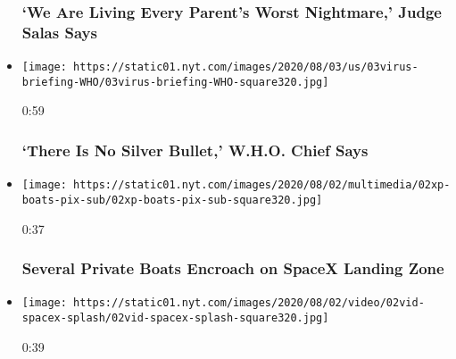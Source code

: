 \begin{itemize}
  \hypertarget{we-are-living-every-parents-worst-nightmare-judge-salas-says}{%
  \subsubsection{`We Are Living Every Parent's Worst Nightmare,' Judge
  Salas
  Says}\label{we-are-living-every-parents-worst-nightmare-judge-salas-says}}
\item
  \href{https://www.nytimes.com/video/world/europe/100000007269932/who-coronavirus-briefing.html?action=click\&module=video-series-bar\&region=header\&pgtype=Article\&playlistId=video/latest-video}{}

  \texttt{[image: https://static01.nyt.com/images/2020/08/03/us/03virus-briefing-WHO/03virus-briefing-WHO-square320.jpg]}

  0:59

  \hypertarget{there-is-no-silver-bullet-who-chief-says}{%
  \subsubsection{`There Is No Silver Bullet,' W.H.O. Chief
  Says}\label{there-is-no-silver-bullet-who-chief-says}}
\item
  \href{https://www.nytimes.com/video/us/100000007269193/boats-circle-spacex-capsule.html?action=click\&module=video-series-bar\&region=header\&pgtype=Article\&playlistId=video/latest-video}{}

  \texttt{[image: https://static01.nyt.com/images/2020/08/02/multimedia/02xp-boats-pix-sub/02xp-boats-pix-sub-square320.jpg]}

  0:37

  \hypertarget{several-private-boats-encroach-on-spacex-landing-zone}{%
  \subsubsection{Several Private Boats Encroach on SpaceX Landing
  Zone}\label{several-private-boats-encroach-on-spacex-landing-zone}}
\item
  \href{https://www.nytimes.com/video/us/100000007269118/spacex-splash-down.html?action=click\&module=video-series-bar\&region=header\&pgtype=Article\&playlistId=video/latest-video}{}

  \texttt{[image: https://static01.nyt.com/images/2020/08/02/video/02vid-spacex-splash/02vid-spacex-splash-square320.jpg]}

  0:39

  \hypertarget{spacexs-crew-dragon-splashes-down-in-gulf-of-mexico}{%
}
\end{itemize}
